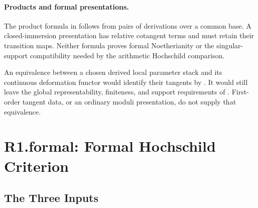 \paragraph{Products and formal presentations.}
The product formula in
 follows from pairs
of derivations over a common base. A closed-immersion presentation
has relative cotangent terms and must retain their transition maps.
Neither formula proves formal Noetherianity or the singular-support
compatibility needed by the arithmetic Hochschild comparison.

\begin{remark}
\label{v4-arith:bzn-sub:rem:R2-novelty}
An equivalence between a chosen derived local parameter stack and its
continuous deformation functor would identify their tangents by
. It would still leave
the global representability, finiteness, and support requirements
of . First-order tangent data,
or an ordinary moduli presentation, do not supply that equivalence.
\end{remark}

\section{R1.formal: Formal Hochschild Criterion}
\label{v4-arith:bzn-sub:R1formal-reduction}

\subsection{The Three Inputs}

